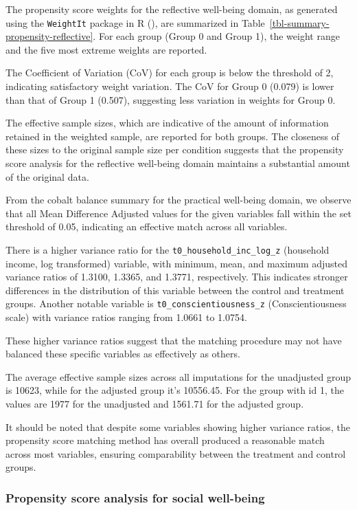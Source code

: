 \documentclass[
  singlecolumn,
  9pt]{article}
\begin{document}
The propensity score weights for the reflective well-being domain, as
generated using the \texttt{WeightIt} package in R
(), are summarized
in Table~\ref{tbl-summary-propensity-reflective}. For each group (Group
0 and Group 1), the weight range and the five most extreme weights are
reported.

The Coefficient of Variation (CoV) for each group is below the threshold
of 2, indicating satisfactory weight variation. The CoV for Group 0
(0.079) is lower than that of Group 1 (0.507), suggesting less variation
in weights for Group 0.

The effective sample sizes, which are indicative of the amount of
information retained in the weighted sample, are reported for both
groups. The closeness of these sizes to the original sample size per
condition suggests that the propensity score analysis for the reflective
well-being domain maintains a substantial amount of the original data.

From the cobalt balance summary for the practical well-being domain, we
observe that all Mean Difference Adjusted values for the given variables
fall within the set threshold of 0.05, indicating an effective match
across all variables.

There is a higher variance ratio for the
\texttt{t0\_household\_inc\_log\_z} (household income, log transformed)
variable, with minimum, mean, and maximum adjusted variance ratios of
1.3100, 1.3365, and 1.3771, respectively. This indicates stronger
differences in the distribution of this variable between the control and
treatment groups. Another notable variable is
\texttt{t0\_conscientiousness\_z} (Conscientiousness scale) with
variance ratios ranging from 1.0661 to 1.0754.

These higher variance ratios suggest that the matching procedure may not
have balanced these specific variables as effectively as others.

The average effective sample sizes across all imputations for the
unadjusted group is 10623, while for the adjusted group it's 10556.45.
For the group with id 1, the values are 1977 for the unadjusted and
1561.71 for the adjusted group.

It should be noted that despite some variables showing higher variance
ratios, the propensity score matching method has overall produced a
reasonable match across most variables, ensuring comparability between
the treatment and control groups.

\subsubsection{Propensity score analysis for social
well-being}\label{propensity-score-analysis-for-social-well-being}
\end{document}

